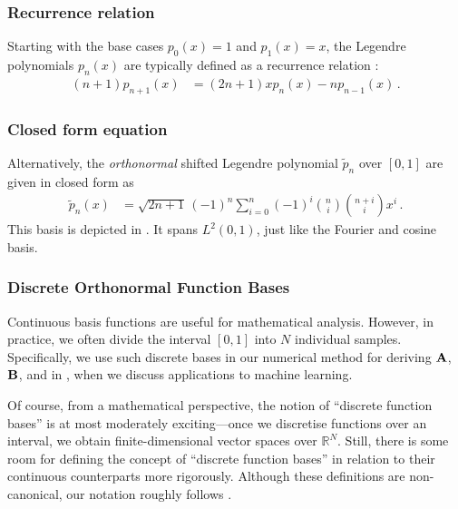 \subsubsection{Recurrence relation}
Starting with the base cases $p_0(x) = 1$ and $p_1(x) = x$, the Legendre polynomials $p_n(x)$ are typically defined as a recurrence relation \citep[Section~4.6.1]{press2007numerical}:
\begin{align}
	(n + 1) p_{n + 1}(x) &= (2n + 1) x p_n(x) - n p_{n - 1}(x) \,.
	\label{eqn:leg_rec}
\end{align}

\subsubsection{Closed form equation}
Alternatively, the \emph{orthonormal} shifted Legendre polynomial $\tilde p_n$ over $[0, 1]$ are given in closed form as
\begin{align}
   \tilde p_n(x) &= \sqrt{2n + 1} \, (-1)^n \sum_{i = 0}^n (-1)^i \binom{n}{i} \binom{n + i}{i} x^i \,.
   	\label{eqn:legendre_basis}
\end{align}
This basis is depicted in . It spans $L^2(0, 1)$, just like the Fourier and cosine basis.

\subsubsection{Discrete Orthonormal Function Bases}
Continuous basis functions are useful for mathematical analysis.
However, in practice, we often divide the interval $[0, 1]$ into $N$ individual samples.
Specifically, we use such discrete bases in our numerical method for deriving $\mathbf{A}$, $\mathbf{B}$, and in , when we discuss applications to machine learning.

Of course, from a mathematical perspective, the notion of \enquote{discrete function bases} is at most moderately exciting---once we discretise functions over an interval, we obtain finite-dimensional vector spaces over $\mathbb{R}^N$.
Still, there is some room for defining the concept of \enquote{discrete function bases} in relation to their continuous counterparts more rigorously.
Although these definitions are non-canonical, our notation roughly follows \citet{neuman1974discrete}.

